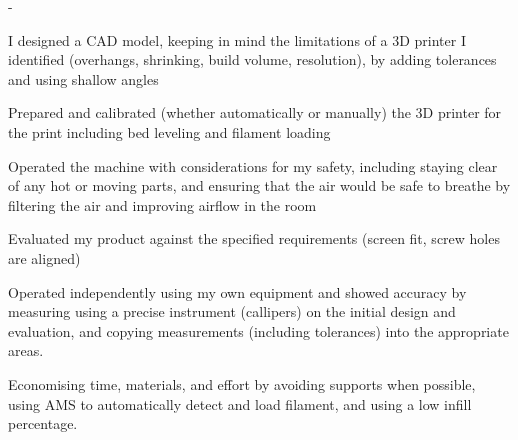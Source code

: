 \documentclass[11pt,a4paper]{article}
\begin{document}
\begin{list}{-}{}
    \item I designed a CAD model, keeping in mind the limitations of a 3D printer I identified (overhangs, shrinking, build volume, resolution), by adding tolerances and using shallow angles
    \item Prepared and calibrated (whether automatically or manually) the 3D printer for the print including bed leveling and filament loading
    \item Operated the machine with considerations for my safety, including staying clear of any hot or moving parts, and ensuring that the air would be safe to breathe by filtering the air and improving airflow in the room
    \item Evaluated my product against the specified requirements (screen fit, screw holes are aligned)
    \item Operated independently using my own equipment and showed accuracy by measuring using a precise instrument (callipers) on the initial design and evaluation, and copying measurements (including tolerances) into the appropriate areas.
    \item Economising time, materials, and effort by avoiding supports when possible, using AMS to automatically detect and load filament, and using a low infill percentage.
\end{list}
\end{document}
